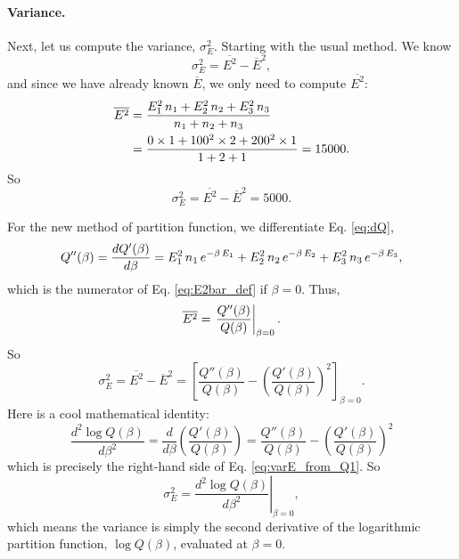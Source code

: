 \documentclass{article}
\begin{document}
\paragraph{Variance.}
Next, let us compute the variance, $\sigma_E^2$.
%
Starting with the usual method. We know
$$
\sigma_E^2 = \overline{ E^2 } - {\overline E}^2,
$$
and since we have already known $\overline E$,
we only need to compute $\overline{ E^2 }$:
%
\begin{align}
  \overline{ E^2 }
  &=
  \frac{ E_1^2 \,  n_1 +  E_2^2 \, n_2 + E_3^2 \, n_3 } { n_1 + n_2 + n_3 }
  \label{eq:E2bar_def}
  \\
  &=
  \frac{ 0 \times 1 + 100^2 \times 2  + 200^2 \times 1 } { 1 + 2 + 1 } = 15000
  .
  \notag
\end{align}
%
So
\begin{equation}
  \sigma_E^2 = \overline{E^2 } - \overline E^2 = 5000.
  \label{eq:varE_ex1}
\end{equation}

For the new method of partition function,
we differentiate Eq. \eqref{eq:dQ},
%
\begin{equation}
  Q''(\beta) = \frac{ d Q'(\beta) } { d\beta }
  = E_1^2 \, n_1 \, e^{-\beta \, E_1} + E_2^2 \, n_2 \, e^{-\beta \, E_2} + E_3^2 \, n_3 \, e^{-\beta \, E_3}
  ,
  \notag
\end{equation}
%
which is the numerator of Eq. \eqref{eq:E2bar_def} if $\beta = 0$. Thus,
%
\begin{equation}
\overline{ E^2 }
  =
  \left. \frac{ Q''(\beta) } { Q(\beta) } \right|_{\beta = 0}
  .
  \notag
\end{equation}
%
So
\begin{equation}
  \sigma_E^2
  =
  \overline{ E^2 } - \overline E^2
  =
  \left[
  \frac{ Q''(\beta) } { Q(\beta) }
  -
  \left( \frac{ Q'(\beta) } { Q(\beta) } \right)^2
  \right]_{\beta = 0}
.
  \label{eq:varE_from_Q1}
\end{equation}
%
Here is a cool mathematical identity:
%
$$
\frac{ d^2 \log Q(\beta) } { d \beta^2 }
=
\frac{d }{d\beta}\left( \frac{ Q'(\beta) } { Q(\beta) } \right)
=
\frac{ Q''(\beta) } { Q(\beta) }
-
\left( \frac{ Q'(\beta) } { Q(\beta) } \right)^2
$$
which is precisely the right-hand side of Eq. \eqref{eq:varE_from_Q1}.
So
\begin{equation}
  \sigma_E^2
  =
  \left.
  \frac{ d^2 \log Q(\beta) } { d \beta^2 }
  \right|_{\beta = 0}
  ,
  \label{eq:varE_from_Q}
\end{equation}
%
which means the variance is simply the second derivative of
the logarithmic partition function, $\log Q(\beta)$,
evaluated at $\beta = 0$.
%
\end{document}

